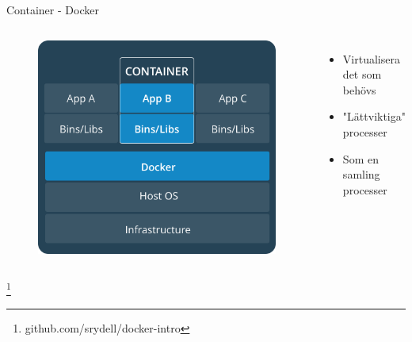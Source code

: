 \documentclass[12pt]{beamer}
\newcommand\blfootnote[1]{%
  \begingroup
  \renewcommand\thefootnote{}\footnote{#1}%
  \addtocounter{footnote}{-1}%
  \endgroup
}
\begin{document}
\begin{frame}{Container - Docker}
    \begin{columns}
        \column{2.5in}
            \begin{figure}[h!]
                \centering
                \includegraphics[width=.8\textwidth]{../figures/containers.png}
            \end{figure}
        \column{2.5in}
            \begin{itemize}
                \item Virtualisera det som behövs
                \item "Lättviktiga" processer
                \item Som en samling processer
            \end{itemize}
        \end{columns}
    \blfootnote{github.com/srydell/docker-intro}
\end{frame}
\end{document}
